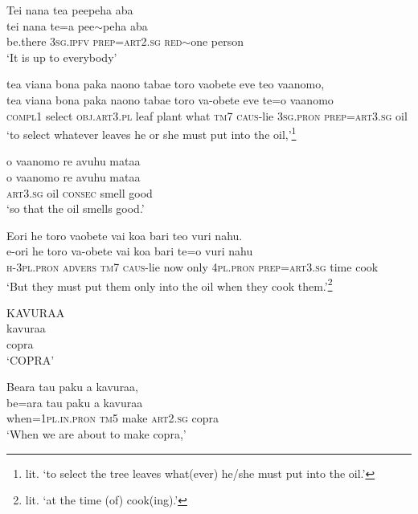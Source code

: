 \ea\label{ex:text01-145}
Tei nana tea peepeha aba\\
\gll tei	nana	te=a	pee{$\sim$}peha	aba\\
     be.there	3\textsc{sg}.\textsc{ipfv}	\textsc{prep}=\textsc{art}2.\textsc{sg}	\textsc{red}{$\sim$}one	person\\
\glt `It is up to everybody'
\z

\ea\label{ex:text01-146}
tea viana bona paka naono tabae toro vaobete eve teo vaanomo,\\
\gll tea	viana	bona	paka	naono	tabae	toro	va-obete	eve	te=o	vaanomo\\
     \textsc{compl}1	select	\textsc{obj}.\textsc{art}3.\textsc{pl}	leaf	plant	what	\textsc{tm}7	\textsc{caus}-lie	3\textsc{sg}.\textsc{pron}	\textsc{prep}=\textsc{art}3.\textsc{sg}	oil\\
\glt `to select whatever leaves he or she must put into the oil,'\footnote{lit. `to select the tree leaves what(ever) he/she must put into the oil.'}
\z

\ea\label{ex:text01-147}
o vaanomo re avuhu mataa\\
\gll o	vaanomo	re	avuhu	mataa\\
     \textsc{art}3.\textsc{sg}	oil	\textsc{consec}	smell	good\\
\glt `so that the oil smells good.'
\z

\ea\label{ex:text01-148}
Eori he toro vaobete vai koa bari teo vuri nahu.\\
\gll e-ori	he	toro	va-obete	vai	koa	bari	te=o	vuri	nahu\\
     \textsc{h}-3\textsc{pl}.\textsc{pron}	\textsc{advers}	\textsc{tm}7	\textsc{caus}-lie	now	only	4\textsc{pl}.\textsc{pron}	\textsc{prep}=\textsc{art}3.\textsc{sg}	time	cook\\
\glt `But they must put them only into the oil when they cook them.'\footnote{lit. `at the time (of) cook(ing).'}
\z

\ea\label{ex:text01-149}
KAVURAA\\
\gll kavuraa\\
     copra\\
\glt `COPRA'
\z

\ea\label{ex:text01-150}
Beara tau paku a kavuraa,\\
\gll be=ara	tau	paku	a	kavuraa\\
     when=1\textsc{pl}.\textsc{in}.\textsc{pron}	\textsc{tm}5	make	\textsc{art}2.\textsc{sg}	copra\\
\glt `When we are about to make copra,'
\z

